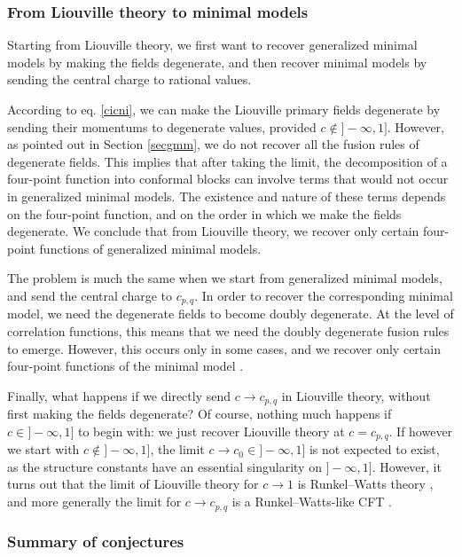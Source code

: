 \documentclass[12pt, a4paper, notitlepage, twoside]{report}
\numberwithin{equation}{section}
\theoremstyle{break}
\begin{document}
\subsubsection{From Liouville theory to minimal models}

Starting from Liouville theory, we first want to recover generalized minimal models by making the fields degenerate, and then recover minimal models by sending the central charge to rational values. 

According to eq. \eqref{cicni}, we can make the Liouville primary fields degenerate by sending their momentums to degenerate values, provided $c\notin ]-\infty, 1]$. However, as pointed out in Section \ref{secgmm}, we do not recover all the fusion rules of degenerate fields. This implies that after taking the limit, the decomposition of a four-point function into conformal blocks can involve terms that would not occur in generalized minimal models. The existence and nature of these terms depends on the four-point function, and on the order in which we make the fields degenerate. We conclude that from Liouville theory, we recover only certain four-point functions of generalized minimal models. 

The problem is much the same when we start from generalized minimal models, and send the central charge to $c_{p, q}$. In order to recover the corresponding minimal model, we need the degenerate fields to become doubly degenerate. At the level of correlation functions, this means that we need the doubly degenerate fusion rules to emerge. However, this occurs only in some cases, and we recover only certain four-point functions of the minimal model \cite{rib18}. 

Finally, what happens if we directly send $c\to c_{p, q}$ in Liouville theory, without first making the fields degenerate? Of course, nothing much happens if $c\in ]-\infty, 1]$ to begin with: we just recover Liouville theory at $c=c_{p, q}$. If however we start with $c\notin ]-\infty, 1]$, the limit $c\to c_0\in ]-\infty, 1]$ is not expected to exist, as the structure constants have an essential singularity on $]-\infty, 1]$. However, it turns out that the limit of Liouville theory for $c\to 1$ is Runkel--Watts theory \cite{sch03}, and more generally the limit for $c\to c_{p,q}$ is a Runkel--Watts-like CFT \cite{mce07}. 



\subsubsection{Summary of conjectures}
\end{document}
